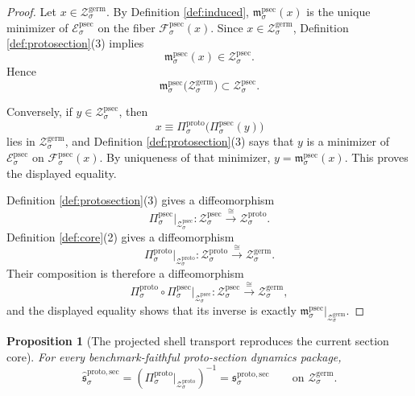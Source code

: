 \documentclass[11pt]{article}
\newcommand{\GermShell}[1]{\mathcal Z_{#1}^{\mathrm{germ}}}
\newcommand{\ProtoProj}[1]{\Pi_{#1}^{\mathrm{proto}}}
\newcommand{\ProtoShell}[1]{\mathcal Z_{#1}^{\mathrm{proto}}}
\newcommand{\ProtoTransportSec}[1]{\mathfrak s_{#1}^{\mathrm{proto,sec}}}
\newcommand{\ProtoSectionProj}[1]{\Pi_{#1}^{\mathrm{psec}}}
\newcommand{\ProtoSectionFiber}[2]{\mathcal F_{#1}^{\mathrm{psec}}(#2)}
\newcommand{\ProtoSectionFunctional}[1]{\mathscr E_{#1}^{\mathrm{psec}}}
\newcommand{\ProtoSectionShell}[1]{\mathcal Z_{#1}^{\mathrm{psec}}}
\newcommand{\ProtoSectionMin}[1]{\mathfrak m_{#1}^{\mathrm{psec}}}
\newcommand{\InducedTransportSec}[1]{\widehat{\mathfrak s}_{#1}^{\mathrm{proto,sec}}}
\newtheorem{proposition}{Proposition}
\begin{document}
\begin{proof}
Let \(x\in\GermShell{\sigma}\). By Definition \ref{def:induced}, \(\ProtoSectionMin{\sigma}(x)\) is the unique minimizer of \(\ProtoSectionFunctional{\sigma}\) on the fiber \(\ProtoSectionFiber{\sigma}{x}\). Since \(x\in\GermShell{\sigma}\), Definition \ref{def:protosection}(3) implies
\[
\ProtoSectionMin{\sigma}(x)\in\ProtoSectionShell{\sigma}.
\]
Hence
\[
\ProtoSectionMin{\sigma}\bigl(\GermShell{\sigma}\bigr)\subset\ProtoSectionShell{\sigma}.
\]

Conversely, if \(y\in\ProtoSectionShell{\sigma}\), then
\[
x\equiv\ProtoProj{\sigma}\bigl(\ProtoSectionProj{\sigma}(y)\bigr)
\]
lies in \(\GermShell{\sigma}\), and Definition \ref{def:protosection}(3) says that \(y\) is a minimizer of \(\ProtoSectionFunctional{\sigma}\) on \(\ProtoSectionFiber{\sigma}{x}\). By uniqueness of that minimizer, \(y=\ProtoSectionMin{\sigma}(x)\). This proves the displayed equality.

Definition \ref{def:protosection}(3) gives a diffeomorphism
\[
\ProtoSectionProj{\sigma}\big|_{\ProtoSectionShell{\sigma}}
:
\ProtoSectionShell{\sigma}\xrightarrow{\cong}\ProtoShell{\sigma}.
\]
Definition \ref{def:core}(2) gives a diffeomorphism
\[
\ProtoProj{\sigma}\big|_{\ProtoShell{\sigma}}
:
\ProtoShell{\sigma}\xrightarrow{\cong}\GermShell{\sigma}.
\]
Their composition is therefore a diffeomorphism
\[
\ProtoProj{\sigma}\circ\ProtoSectionProj{\sigma}\big|_{\ProtoSectionShell{\sigma}}
:
\ProtoSectionShell{\sigma}\xrightarrow{\cong}\GermShell{\sigma},
\]
and the displayed equality shows that its inverse is exactly \(\ProtoSectionMin{\sigma}\big|_{\GermShell{\sigma}}\).
\end{proof}

\begin{proposition}[The projected shell transport reproduces the current section core]
\label{prop:sectioncore}
For every benchmark-faithful proto-section dynamics package,
\[
\InducedTransportSec{\sigma}
=
\left(
\ProtoProj{\sigma}\big|_{\ProtoShell{\sigma}}
\right)^{-1}
=
\ProtoTransportSec{\sigma}
\qquad
\text{on }\GermShell{\sigma}.
\]
\end{proposition}
\end{document}
